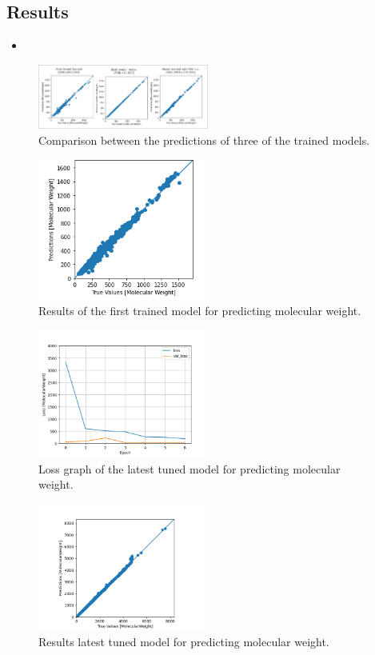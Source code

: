     \subsection{Results}
    \begin{itemize}
        \item 
    \end{itemize}
    \begin{figure}
        \centering
        \includegraphics[width=0.5\textwidth]{figures/graphs-Mol-Wei_Comp1.jpg}
        \caption{Comparison between the predictions of three of the trained models.}
        \label{fig:model2-mol-weight-loss}
    \end{figure}
    \begin{figure}
        \centering
        \includegraphics[width=0.5\textwidth]{model_2_prediction.PNG}
        \caption{Results of the first trained model for predicting molecular weight.}
        \label{fig:model2-mol-weight-predictions}
    \end{figure}
    \begin{figure}
        \centering
        \includegraphics[width=0.5\textwidth]{model_20_7_epochs_loss_MolecularWeight.png}
        \caption{Loss graph of the latest tuned model for predicting molecular weight.}
        \label{fig:model20-mol-weight-loss}
    \end{figure}
    \begin{figure}
        \centering
        \includegraphics[width=0.5\textwidth]{model_20_7_epochs_predictions_MolecularWeight.png}
        \caption{Results latest tuned model for predicting molecular weight.}
        \label{fig:model20-mol-weight-predictions}
    \end{figure}